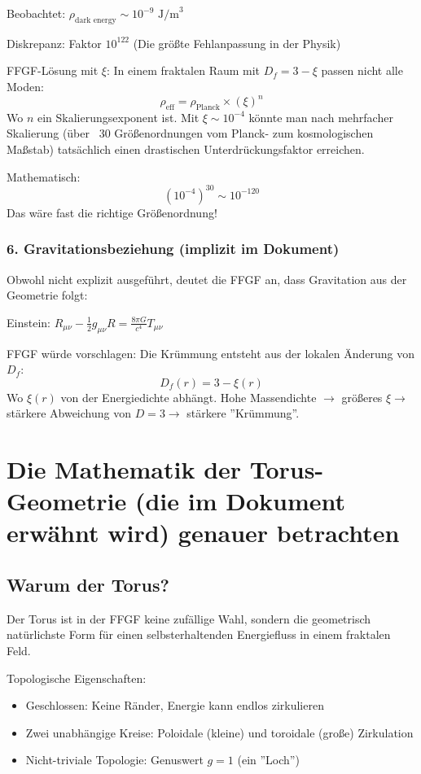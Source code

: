 \documentclass[12pt,a4paper]{article}
\begin{document}
	Beobachtet: \( \rho_{\text{dark energy}} \sim 10^{-9} \text{ J/m}^3 \)
	
	Diskrepanz: Faktor \( 10^{122} \) (Die größte Fehlanpassung in der Physik)
	
	FFGF-Lösung mit \( \xi \):
	In einem fraktalen Raum mit \( D_f = 3 - \xi \) passen nicht alle Moden:
	\[
	\rho_{\text{eff}} = \rho_{\text{Planck}} \times (\xi)^n
	\]
	Wo \( n \) ein Skalierungsexponent ist. Mit \( \xi \sim 10^{-4} \) könnte man nach mehrfacher Skalierung (über ~30 Größenordnungen vom Planck- zum kosmologischen Maßstab) tatsächlich einen drastischen Unterdrückungsfaktor erreichen.
	
	Mathematisch:
	\[
	(10^{-4})^{30} \sim 10^{-120}
	\]
	Das wäre fast die richtige Größenordnung!
	
	\subsubsection{6. Gravitationsbeziehung (implizit im Dokument)}
	Obwohl nicht explizit ausgeführt, deutet die FFGF an, dass Gravitation aus der Geometrie folgt:
	
	Einstein: \( R_{\mu\nu} - \frac{1}{2}g_{\mu\nu}R = \frac{8\pi G}{c^4} T_{\mu\nu} \)
	
	FFGF würde vorschlagen: Die Krümmung entsteht aus der lokalen Änderung von \( D_f \):
	\[
	D_f(r) = 3 - \xi(r)
	\]
	Wo \( \xi(r) \) von der Energiedichte abhängt. Hohe Massendichte \( \rightarrow \) größeres \( \xi \rightarrow \) stärkere Abweichung von \( D=3 \rightarrow \) stärkere ''Krümmung''.
	
	\section{Die Mathematik der Torus-Geometrie (die im Dokument erwähnt wird) genauer betrachten}
	\subsection{Warum der Torus?}
	Der Torus ist in der FFGF keine zufällige Wahl, sondern die geometrisch natürlichste Form für einen selbsterhaltenden Energiefluss in einem fraktalen Feld.
	
	Topologische Eigenschaften:
	\begin{itemize}
		\item Geschlossen: Keine Ränder, Energie kann endlos zirkulieren
		\item Zwei unabhängige Kreise: Poloidale (kleine) und toroidale (große) Zirkulation
		\item Nicht-triviale Topologie: Genuswert \( g = 1 \) (ein ''Loch'')
	\end{itemize}
	
\end{document}
